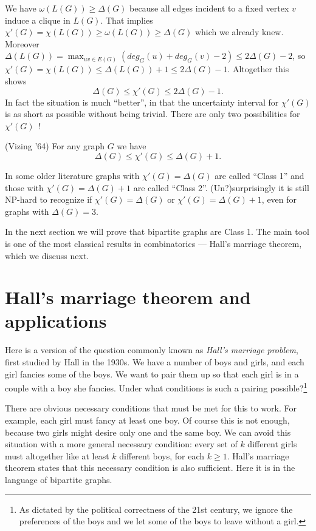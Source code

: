 We have $\omega(L(G))\geq \Delta(G)$ because all edges incident to a fixed vertex $v$ induce a clique in $L(G)$. That implies $\chi'(G)=\chi(L(G))\geq \omega(L(G))\geq \Delta(G)$ which we already knew. Moreover $\Delta(L(G))= \max_{uv\in E(G)}(deg_G(u)+deg_G(v)-2)\leq 2\Delta(G)-2$, so $\chi'(G)=\chi(L(G)) \leq \Delta(L(G))+1\leq 2\Delta(G)-1$. Altogether this shows
$$\Delta(G)\leq \chi'(G) \leq 2\Delta(G)-1.$$
In fact the situation is much ``better'', in that the uncertainty interval for $\chi'(G)$ is as short as possible without being trivial. There are only two possibilities for $\chi'(G)$\ !
\begin{theorem}
\label{thm:vizing}
(Vizing '64) For any graph $G$ we have
$$\Delta(G)\leq \chi'(G) \leq \Delta(G)+1.$$
\end{theorem}
\begin{remark}
In some older literature graphs with $\chi'(G)=\Delta(G)$ are called ``Class 1'' and those with $\chi'(G)=\Delta(G)+1$ are called ``Class 2''. (Un?)surprisingly it is still NP-hard to recognize if $\chi'(G)=\Delta(G)$ or $\chi'(G)=\Delta(G)+1$, even for graphs with $\Delta(G)=3$.
\end{remark}

In the next section we will prove that bipartite graphs are Class 1. The main tool is one of the most classical results in combinatorics --- Hall's marriage theorem, which we discuss next.


\section{Hall's marriage theorem and applications}

Here is a version of the question commonly known as \emph{Hall's marriage problem}, first studied by Hall in the 1930s. We have a number of boys and girls, and each girl fancies some of the boys. We want to pair them up so that each girl is in a couple with a boy she fancies. Under what conditions is such a pairing possible?\footnote{As dictated by the political correctness of the 21st century, we ignore the preferences of the boys and we let some of the boys to leave without a girl.}

There are obvious necessary conditions that must be met for this to work. For example, each girl must fancy at least one boy. Of course this is not enough, because two girls might desire only one and the same boy. We can avoid this situation with a more general necessary condition: every set of $k$ different girls must altogether like at least $k$ different boys, for each $k\geq 1$. Hall's marriage theorem states that this necessary condition is also sufficient. Here it is in the language of bipartite graphs.

